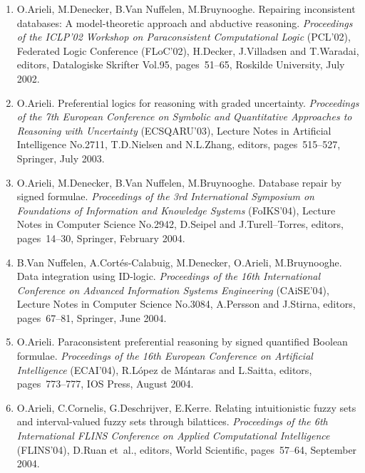 \documentclass{article}
\begin{document}
\begin{enumerate}
   \item O.Arieli, M.Denecker, B.Van Nuffelen, M.Bruynooghe.
         Repairing inconsistent databases: A model-theoretic approach and
         abductive reasoning. {\em Proceedings of the ICLP'02 Workshop on
         Paraconsistent Computational Logic\/} (PCL'02),
         Federated Logic Conference (FLoC'02),
         H.Decker, J.Villadsen and T.Waradai, editors, Datalogiske Skrifter
         Vol.95, pages~51--65, Roskilde University, July 2002.

   \item O.Arieli.
         Preferential logics for reasoning with graded uncertainty.
         {\em Proceedings of the 7th European Conference on Symbolic and Quantitative
         Approaches to Reasoning with Uncertainty\/} (ECSQARU'03),
         Lecture Notes in Artificial Intelligence No.2711,
         T.D.Nielsen and N.L.Zhang, editors, pages~515--527,
         Springer, July 2003.

   \item O.Arieli, M.Denecker, B.Van Nuffelen, M.Bruynooghe.
         Database repair by signed formulae. {\em Proceedings of the 3rd
         International Symposium on Foundations of Information and
         Knowledge Systems\/} (FoIKS'04),
         Lecture Notes in Computer Science No.2942, D.Seipel and
         J.Turell--Torres, editors, pages~14--30, Springer, February 2004.

   \item B.Van Nuffelen, A.Cort\'es-Calabuig, M.Denecker, O.Arieli, M.Bruynooghe.
         Data integration using ID-logic. {\em Proceedings of the 16th
         International Conference on Advanced Information Systems
         Engineering\/} (CAiSE'04), Lecture Notes in
         Computer Science No.3084, A.Persson and J.Stirna, editors,
         pages~67--81, Springer, June 2004.

   \item O.Arieli.
         Paraconsistent preferential reasoning by signed quantified Boolean
         formulae. {\em Proceedings of the 16th European Conference on Artificial
         Intelligence\/} (ECAI'04), R.L\'opez de M\'antaras
         and L.Saitta, editors, pages~773--777, IOS Press, August 2004.

   \item O.Arieli, C.Cornelis, G.Deschrijver, E.Kerre.
         Relating intuitionistic fuzzy sets and interval-valued fuzzy sets
         through bilattices. {\em Proceedings of the 6th International FLINS Conference
         on Applied Computational Intelligence\/} (FLINS'04),
         D.Ruan et~al., editors, World Scientific, pages~57--64, September 2004.


\end{enumerate}
\end{document}
